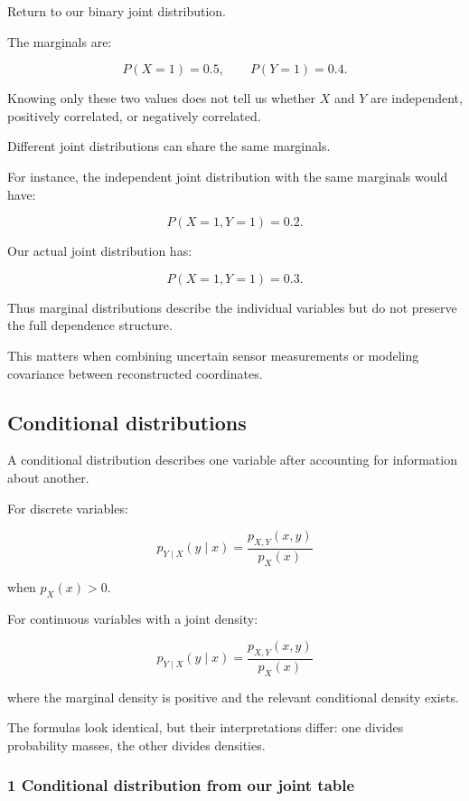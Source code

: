 \hypertarget{02-foundations-ii-ch023-marginalization-loses-dependence-information}{}

Return to our binary joint distribution.

The marginals are:

\[
 P(X=1)=0.5, \qquad P(Y=1)=0.4.
\]

Knowing only these two values does not tell us whether \(X\) and \(Y\) are independent, positively correlated, or negatively correlated.

Different joint distributions can share the same marginals.

For instance, the independent joint distribution with the same marginals would have:

\[
 P(X=1,Y=1)=0.2.
\]

Our actual joint distribution has:

\[
 P(X=1,Y=1)=0.3.
\]

Thus marginal distributions describe the individual variables but do not preserve the full dependence structure.

This matters when combining uncertain sensor measurements or modeling covariance between reconstructed coordinates.

\subsection{Conditional distributions}\label{02-foundations-ii-ch023-conditional-distributions}

\hypertarget{02-foundations-ii-ch023-conditional-distributions}{}

A conditional distribution describes one variable after accounting for information about another.

For discrete variables:

\[
 \boxed{ p_{Y\mid X}(y\mid x) = \frac{p_{X,Y}(x,y)}{p_X(x)} }
\]

when \(p_X(x)>0\).

For continuous variables with a joint density:

\[
 \boxed{ p_{Y\mid X}(y\mid x) = \frac{p_{X,Y}(x,y)}{p_X(x)} }
\]

where the marginal density is positive and the relevant conditional density exists.

The formulas look identical, but their interpretations differ: one divides probability masses, the other divides densities.

\subsubsection{1 Conditional distribution from our joint table}\label{02-foundations-ii-ch023-conditional-distribution-from-our-joint-table}

